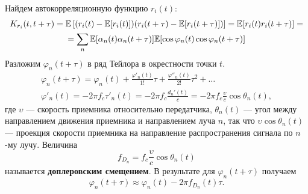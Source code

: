 \documentclass{book}
\numberwithin{theorem}{chapter}
\numberwithin{statement}{chapter}
\numberwithin{lemma}{chapter}
\theoremstyle{definition}
\numberwithin{task}{chapter}
\theoremstyle{remark}
\numberwithin{example}{chapter}
\theoremstyle{definition}
\numberwithin{definition}{chapter}
\theoremstyle{remark}
\theoremstyle{remark}
\numberwithin{lyrics}{section}
\begin{document}
Найдем автокорреляционную функцию $r_i(t)$:
\begin{gather*}
K_{r_i}(t, t + \tau) = \mathbb{E}\left[(r_i(t) - \mathbb{E}[r_i(t)])(r_i(t + \tau) - \mathbb{E}[r_i(t + \tau)])\right] = \mathbb{E}[r_i(t)r_i(t + \tau)] = \\ =  \sum\limits_n \mathbb{E}[\alpha_n(t) \alpha_n(t + \tau)] \mathbb{E}[\cos \varphi_n(t) \cos \varphi_n(t + \tau)] 
\end{gather*}
Разложим $\varphi_n(t + \tau)$ в ряд Тейлора в окрестности точки $t$.
\begin{gather*}
\varphi_n(t + \tau) = \varphi_n(t) + \frac{\varphi'_n(t)}{1!} \tau + \frac{\varphi''_n(t)}{2!} \tau^2 + \dots \\
\varphi'_n(t) = -2\pi f_c \tau'_n(t) = -2\pi f_c \frac{d_n'(t)}{c} = - 2\pi f_c \frac{\upsilon}{c} \cos \theta_n(t),
\end{gather*}
где $\upsilon$ --- скорость приемника относительно передатчика, $\theta_n(t)$ --- угол между направлением движения приемника и направлением луча $n$, так что $\upsilon \cos\theta_n(t)$ --- проекция скорости приемника на направление распространения сигнала по $n$-му лучу. Величина 
$$
f_{D_n} = f_c\frac{\upsilon}{c}\cos \theta_n(t)
$$
называется \textbf{доплеровским смещением}. В результате для $\varphi_n(t +\tau)$ получаем
$$
\varphi_n(t +\tau) \approx \varphi_n(t) - 2 \pi f_{D_n}(t) \tau.
$$
\end{document}

